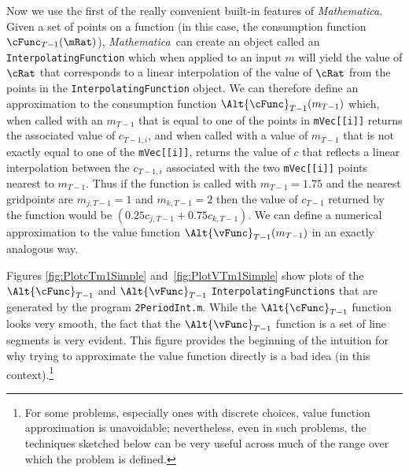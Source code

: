 \documentclass[titlepage]{\econtex}
\newcommand{\Mma}{\textit{Mathematica}}
\begin{document}
Now we use the first of the really convenient built-in features of
 {\Mma}.
Given a set of points on a function (in this case, the consumption
function $\cFunc_{T-1}(\mRat)$), {\Mma}~can create an object
called an \texttt{InterpolatingFunction} which when applied to an
input ${m}$ will yield the value of $\cRat$ that corresponds to a
linear interpolation of the value of $\cRat$ from the points in the
\texttt{InterpolatingFunction} object.  We can therefore define an 
approximation to the consumption function $\Alt{\cFunc}_{T-1}({m}_{T-1})$ which, when called with an
${m}_{T-1}$ that is equal to one of the points in
\texttt{mVec[[i]]} returns the associated value of
${c}_{T-1,i}$, and when called with a value of ${m}_{T-1}$ that
is not exactly equal to one of the \texttt{mVec[[i]]}, returns
the value of ${c}$ that reflects a linear interpolation between the
${c}_{T-1,i}$ associated with the two \texttt{mVec[[i]]}
points nearest to ${m}_{T-1}$.  Thus if the function is called with
${m}_{T-1} = 1.75$ and the nearest gridpoints
 are ${m}_{j,T-1}=1$ and
${m}_{k,T-1}=2$ then the value of ${c}_{T-1}$ returned by the
function would be $(0.25 {c}_{j,T-1}+0.75 {c}_{k,T-1})$. We
can define a numerical approximation to the value function
$\Alt{\vFunc}_{T-1}({m}_{T-1})$ in an exactly analogous way.


Figures \ref{fig:PlotcTm1Simple} and~\ref{fig:PlotVTm1Simple} show
plots of the $\Alt{\cFunc}_{T-1}$ and $\Alt{\vFunc}_{T-1}$
\texttt{InterpolatingFunctions} that are generated by the program
\texttt{2PeriodInt.m}.  While the $\Alt{\cFunc}_{T-1}$ function looks
very smooth, the fact that the $\Alt{\vFunc}_{T-1}$ function is a set
of line segments is very evident.  This figure provides the beginning
of the intuition for why trying to approximate the value function
directly is a bad idea (in this context).\footnote{For some problems,
  especially ones with discrete choices, value function approximation is unavoidable;
  nevertheless, even in such problems, the techniques sketched below can
  be very useful across much of the range over which the problem is defined.}
\end{document}
